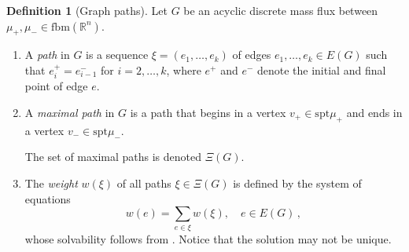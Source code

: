\documentclass[10pt,a4paper,oneside,final]{article}
\newcommand{\R}{{\mathbb{R}}}
\DeclareMathOperator{\dv}{div}
\newcommand{\fbm}{{\mathrm{fbm}}}
\newcommand{\restr}{{\mbox{\LARGE$\llcorner$}}}
\newcommand{\spt}{{\mathrm{spt}}}
\newcommand{\weakstarto}{\stackrel{*}{\rightharpoonup}}
\newcommand{\flux}{{\mathcal{F}}}
\newcommand{\dtau}{d_\tau}
\newcommand{\transportPath}{mass flux}
\numberwithin{equation}{section}
\theoremstyle{plain}
\theoremstyle{definition}
\newtheorem{definition}[theorem]{Definition}
\theoremstyle{remark}
\newtheorem{example}[theorem]{Example}
\newcommand{\notinclude}[1]{}
\begin{document}
\begin{definition}[Graph paths]
Let $G$ be an acyclic discrete \transportPath{} between $\mu_+,\mu_-\in\fbm(\R^n)$.
\begin{enumerate}
\item A \emph{path} in $G$ is a sequence $\xi = (e_1,\ldots,e_k)$ of edges $e_1,\ldots,e_k\in E(G)$ such that $e_i^+ = e_{i-1}^-$ for $i = 2,\ldots,k$, where $e^+$ and $e^-$ denote the initial and final point of edge $e$.
\item A \emph{maximal path} in $G$ is a path that begins in a vertex $v_+\in\spt\mu_+$ and ends in a vertex $v_-\in\spt\mu_-$.
\notinclude{It is not necessarily a path which is not a subsequence of any other path, since a source point may also have an incoming edge.}
The set of maximal paths is denoted $\Xi(G)$.
\item The \emph{weight} $w(\xi)$ of all paths $\xi\in\Xi(G)$ is defined by the system of equations
\begin{displaymath}
 w(e) = \sum_{e \in \xi} w(\xi), \quad e \in E(G)\,,
\end{displaymath}
whose solvability follows from \cite[Lemma 7.1]{Xia-Optimal-Paths}. Notice that the solution may not be unique.
\end{enumerate}
\end{definition}

\notinclude{
\begin{example}[Measure in between]
Let $\mu_+,\mu_-\in\fbm$ with same mass and
let $A\subset\R^n$ with smooth boundary $\partial A$ and $\spt\mu_+\subset A$, $\spt\mu_-\subset\R^2\setminus A$.
Then there exists a measure $\mu$ in between $\mu_+$ and $\mu_-$, i.\,e.\ with $\mu\neq\mu_+,\mu_-$ and $\dtau(\mu_+,\mu_-)=\dtau(\mu_+,\mu)+\dtau(\mu,\mu_-)$, i.e. the equality is realised in the triangle inequality.
\end{example}
\begin{proof}
Let $G^k$ be an approximating graph sequence for $\dtau(\mu_+,\mu_-)$.
Then $G^k=G^k_1\cup G^k_2$ for graphs defined via $\flux_{G^k_1}=\flux_{G^k}\restr A$ and $\flux_{G^k_2}=\flux_{G^k}-\flux_{G^k_1}$.
Obviously, $\dv\flux_{G^k_1}=\mu_+^k-\mu^k$ and $\dv\flux_{G^k_1}=\mu^k-\mu_-^k$, where $\spt\mu^k\subset\partial A$ and $\mu_+^k\weakstarto\mu_+$, $\mu_-^k\weakstarto\mu_-$, $\mu^k\weakstarto\mu$ (the latter follows at least for a subsequence with $\mu\subset\partial A$).
Thus, $G^k_1$ and $G^k_2$ are approximating graph sequences for transport from $\mu_+$ to $\mu$ and from $\mu$ to $\mu_-$, respectively, so that $\dtau(\mu_+,\mu_-)\geq\dtau(\mu_+,\mu)+\dtau(\mu,\mu_-)$.
That this is actually an equality follows from the triangle inequality.
\end{proof}
}%
\end{document}
